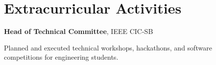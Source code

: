 \section{Extracurricular Activities}
    \textbf{Head of Technical Committee}, IEEE CIC-SB

    \begin{onecolentry}
        \begin{highlights}
            \item Planned and executed technical workshops, hackathons, and software competitions for engineering students.
        \end{highlights}
    \end{onecolentry}